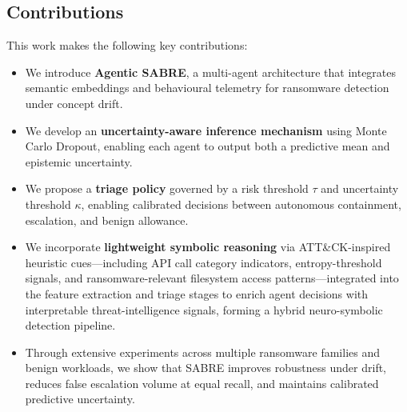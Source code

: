 \documentclass[3p]{elsarticle}
\begin{document}
\subsection{Contributions}
This work makes the following key contributions:
\begin{itemize}
    \item We introduce \textbf{Agentic SABRE}, a multi-agent architecture that
    integrates semantic embeddings and behavioural telemetry for ransomware
    detection under concept drift.

    \item We develop an \textbf{uncertainty-aware inference mechanism} using
    Monte Carlo Dropout, enabling each agent to output both a predictive mean and
    epistemic uncertainty.

    \item We propose a \textbf{triage policy} governed by a risk threshold
    \(\tau\) and uncertainty threshold \(\kappa\), enabling calibrated decisions
    between autonomous containment, escalation, and benign allowance.

\item \colorbox{yellow!25}{\parbox{0.9\linewidth}{We incorporate \textbf{lightweight symbolic reasoning} via
    ATT\&CK-inspired heuristic cues---including API call category indicators,
    entropy-threshold signals, and ransomware-relevant filesystem access
    patterns---integrated into the feature extraction and triage stages to
    enrich agent decisions with interpretable threat-intelligence signals,
    forming a hybrid neuro-symbolic detection pipeline.}}

    \item Through extensive experiments across multiple ransomware families and
    benign workloads, we show that SABRE improves robustness under drift, reduces
    false escalation volume at equal recall, and maintains calibrated predictive
    uncertainty.
\end{itemize}
\end{document}
